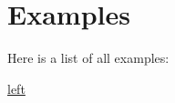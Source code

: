 \section{Examples}
Here is a list of all examples\-:\begin{DoxyCompactItemize}
\item 
\hyperlink{left-example}{left}
\end{DoxyCompactItemize}
